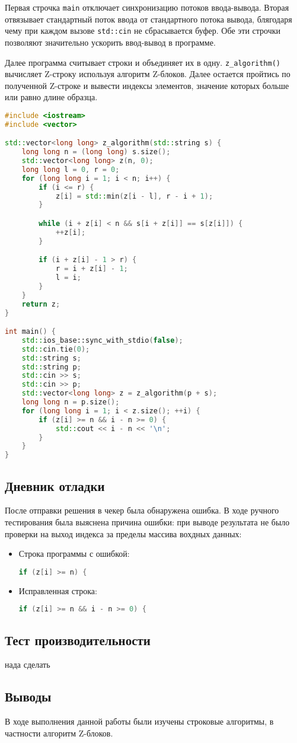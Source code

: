 \documentclass[12pt]{article}
\begin{document}
Первая строчка \texttt{main} отключает синхронизацию потоков ввода-вывода. Вторая отвязывает стандартный поток ввода от стандартного потока вывода, блягодаря чему при каждом вызове \texttt{std::cin} не сбрасывается буфер. Обе эти строчки позволяют значительно ускорить ввод-вывод в программе.

Далее программа считывает строки и объединяет их в одну. \texttt{z\_algorithm()} вычисляет Z-строку используя алгоритм Z-блоков. Далее остается пройтись по полученной Z-строке и вывести индексы элементов, значение которых больше или равно длине образца.

\begin{lstlisting}[language=C++]
#include <iostream>
#include <vector>

std::vector<long long> z_algorithm(std::string s) {
    long long n = (long long) s.size();
    std::vector<long long> z(n, 0);
    long long l = 0, r = 0;
    for (long long i = 1; i < n; i++) {
        if (i <= r) {
            z[i] = std::min(z[i - l], r - i + 1);
        }

        while (i + z[i] < n && s[i + z[i]] == s[z[i]]) {
            ++z[i];
        }

        if (i + z[i] - 1 > r) {
            r = i + z[i] - 1;
            l = i;
        }
    }
    return z;
}

int main() {
    std::ios_base::sync_with_stdio(false);
	std::cin.tie(0);
    std::string s;
    std::string p;
    std::cin >> s;
    std::cin >> p;
    std::vector<long long> z = z_algorithm(p + s);
    long long n = p.size();
    for (long long i = 1; i < z.size(); ++i) {
        if (z[i] >= n && i - n >= 0) {
            std::cout << i - n << '\n';
        }
    }
}
\end{lstlisting}

\subsection*{Дневник отладки}

После отправки решения в чекер была обнаружена ошибка. В ходе ручного тестирования была выяснена причина ошибки: при выводе результата не было проверки на выход индекса за пределы массива вохдных данных:
\begin{itemize}
\item
    Строка программы с ошибкой:
    \begin{lstlisting}[language=C++]
            if (z[i] >= n) {
    \end{lstlisting}
\item
    Исправленная строка:
    \begin{lstlisting}[language=C++]
            if (z[i] >= n && i - n >= 0) {
    \end{lstlisting}
\end{itemize}

\subsection*{Тест производительности}
нада сделать

\subsection*{Выводы}

В ходе выполнения данной работы были изучены строковые алгоритмы, в частности алгоритм Z-блоков. 
\end{document}
